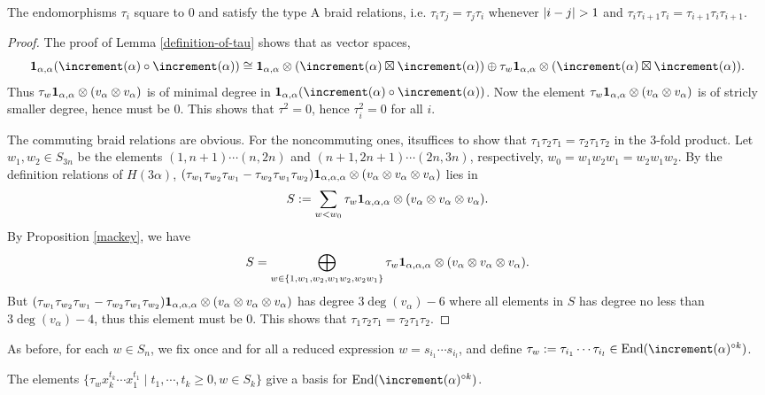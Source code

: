 \begin{lemma}
    The endomorphisms $\tau_i$ square to $0$ and satisfy the type 
    A braid relations, i.e. $\tau_i\tau_j = \tau_j\tau_i$ whenever
    $\abs{i-j}>1$ and $\tau_i\tau_{i+1}\tau_i = \tau_{i+1}\tau_i\tau_{i+1}$.
\end{lemma}

\begin{proof}
    The proof of Lemma \ref{definition-of-tau} shows that 
    as vector spaces, 
    \[
        \1_{\alpha,\alpha}(\std(\alpha)\circ\std(\alpha))
        \cong\1_{\alpha,\alpha}\ox(\std(\alpha)\ex\std(\alpha))
        \oplus\tau_w\1_{\alpha,\alpha}\ox(\std(\alpha)\ex\std(\alpha)).
    \]
    Thus $\tau_w\mathbf{1}_{\alpha,\alpha}\otimes(v_\alpha\otimes v_\alpha)$ is of
    minimal degree in $\1_{\alpha,\alpha}(\std(\alpha)\circ\std(\alpha))$.
    Now the element $\tau_w\mathbf{1}_{\alpha,\alpha}\otimes(v_\alpha\otimes v_\alpha)$ is of
    stricly smaller degree, hence must be $0$. This shows that
    $\tau^2 = 0$, hence $\tau_i^2 = 0$ for all $i$.

    The commuting braid relations are obvious. For the noncommuting ones,
    itsuffices to show that $\tau_1\tau_2\tau_1 = \tau_2\tau_1\tau_2$
    in the 3-fold product. Let $w_1,w_2\in S_{3n}$ be the elements
    $(1,n+1)\cdots(n,2n)$ and $(n+1,2n+1)\cdots(2n,3n)$, respectively,
    $w_0 = w_1w_2w_1 = w_2w_1w_2$. By the definition relations of $H(3\alpha)$,
    $(\tau_{w_1}\tau_{w_2}\tau_{w_1}-\tau_{w_2}\tau_{w_1}\tau_{w_2})
    \mathbf{1}_{\alpha,\alpha,\alpha}\otimes(v_\alpha\otimes v_\alpha\otimes v_\alpha)$
    lies in $$S := \sum_{w<w_0}\tau_w\mathbf{1}_{\alpha,\alpha,\alpha}\otimes
    (v_\alpha\otimes v_\alpha\otimes v_\alpha).$$ By Proposition \ref{mackey},
    we have 
    \[
        S = \bigoplus_{w\in\{1,w_1,w_2,w_1w_2,w_2w_1\}}
        \tau_w\mathbf{1}_{\alpha,\alpha,\alpha}\otimes
        (v_\alpha\otimes v_\alpha\otimes v_\alpha).
    \] 
    But 
    $(\tau_{w_1}\tau_{w_2}\tau_{w_1}-\tau_{w_2}\tau_{w_1}\tau_{w_2})
    \mathbf{1}_{\alpha,\alpha,\alpha}\otimes(v_\alpha\otimes v_\alpha\otimes v_\alpha)$
    has degree $3\deg(v_\alpha)-6$ where all elements in $S$
    has degree no less than $3\deg(v_\alpha)-4$, thus
    this element must be $0$. This shows that $\tau_1\tau_2\tau_1
     = \tau_2\tau_1\tau_2$.
\end{proof}

As before, for each $w\in S_n$, we fix once and for all a reduced expression $w = s_{i_1}\cdots s_{i_l}$,
and define $\tau_w := \tau_{i_1}\cdots\tau_{i_l}\in\End(\std(\alpha)^{\circ k})$.

\begin{lemma}
    The elements $\{\tau_w x_k^{t_k}\cdots x_1^{t_1}\mid t_1,\cdots,t_k\ge 0,
    w\in S_k\}$ give a basis for $\End(\std(\alpha)^{\circ k})$.
\end{lemma}

